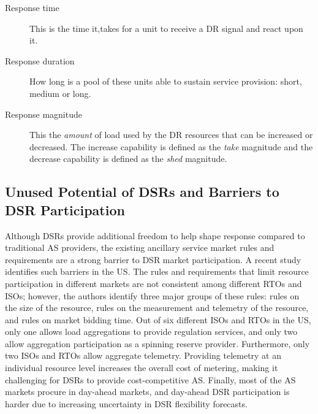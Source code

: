 \begin{description}
    \item[Response time] This is the time it,takes for a unit to receive a DR signal and react upon it. %
    \item[Response duration] How long is a pool of these units able to sustain service provision: short, medium or long. %
    \item[Response magnitude] This the \emph{amount} of load used by the DR resources that can be increased or decreased. The increase capability is defined as the \emph{take} magnitude and the decrease capability is defined as the \emph{shed} magnitude.
\end{description}


\subsection{Unused Potential of DSRs and Barriers to DSR Participation}

\label{subsec:unused}
Although DSRs provide additional freedom to help shape response compared to traditional AS providers, the existing ancillary service market rules and requirements are a strong barrier to DSR market participation. A recent study identifies such barriers in the US\cite{cappers2013assessment}. The rules and requirements that limit resource participation in different markets are not consistent among different RTOs and ISOs; however, the authors identify three major groups of these rules: rules on the size of the resource, rules on the measurement and telemetry of the resource, and rules on market bidding time. Out of six different ISOs and RTOs in the US, only one allows load aggregations to provide regulation services, and only two allow aggregation participation as a spinning reserve provider. Furthermore, only two ISOs and RTOs allow aggregate telemetry. Providing telemetry at an individual resource level increases the overall cost of metering, making it challenging for DSRs to provide cost-competitive AS. Finally, most of the AS markets procure in day-ahead markets, and day-ahead DSR participation is harder due to increasing uncertainty in DSR flexibility forecasts.  


